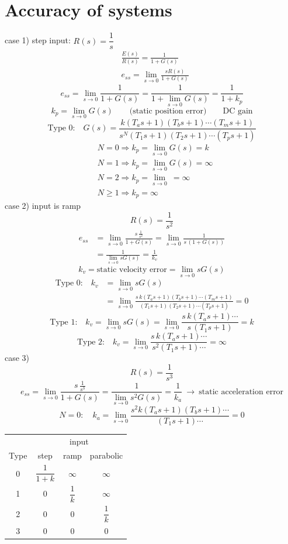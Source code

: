 \documentclass[11pt,a4paper]{article}
\begin{document}
\section{Accuracy of systems}
case 1) step input: $R(s)=\dfrac{1}{s}$
\begin{align*}
&\frac{E(s)}{R(s)}=\frac{1}{1+G(s)}\\
&e_{ss}=\lim_{s\to0}\frac{sR(s)}{1+G(s)}
\end{align*}
\[ e_{ss}=\lim_{s\to0}\frac{1}{1+G(s)}=\frac{1}{1+\lim\limits_{s\to0}G(s)}=\frac{1}{1+k_p} \]
\[ k_p=\lim_{s\to0}G(s)\qquad\text{(static position error)}\qquad\text{DC gain} \]
\[ \text{Type 0:}\quad G(s)=\frac{k(T_as+1)(T_bs+1)\cdots(T_ms+1)}{s^{N}(T_1s+1)(T_2s+1)\cdots(T_ps+1)} \]
\begin{align*}
&N=0\Rightarrow k_p=\lim_{s\to0}G(s)=k\\
&N=1\Rightarrow k_p=\lim_{s\to0}G(s)=\infty\\
&N=2\Rightarrow k_p=\lim_{s\to0}\ =\infty\\
&N\geq1\Rightarrow k_p=\infty
\end{align*}
case 2) input is ramp
\[ R(s)=\frac{1}{s^{2}} \]
\begin{align*}
e_{ss}&=\lim_{s\to0}\frac{s\,\frac{1}{s^{2}}}{1+G(s)}=\lim_{s\to0}\frac{1}{s\,(1+G(s))}\\
&=\frac{1}{\lim\limits_{s\to0}sG(s)}=\frac{1}{k_v}
\end{align*}
\[ k_v=\text{static velocity error}=\lim_{s\to0}sG(s) \]
\begin{align*}
\text{Type 0:}\quad k_v&=\lim_{s\to0}sG(s)\\
&=\lim_{s\to0}\frac{s\,k(T_as+1)(T_bs+1)\cdots(T_ms+1)}{(T_1s+1)(T_2s+1)\cdots(T_ps+1)}=0
\end{align*}
\[ \text{Type 1:}\quad k_v=\lim_{s\to0}sG(s)=\lim_{s\to0}\frac{s\,k(T_as+1)\cdots}{s\,(T_1s+1)}=k \]
\[ \text{Type 2:}\quad k_v=\lim_{s\to0}\frac{s\,k(T_as+1)\cdots}{s^{2}(T_1s+1)\cdots}=\infty \]
case 3)
\[ R(s)=\frac{1}{s^{3}} \]
\[ e_{ss}=\lim_{s\to0}\frac{s\,\frac{1}{s^{3}}}{1+G(s)}=\frac{1}{\lim\limits_{s\to0}s^{2}G(s)}=\frac{1}{k_a}\ \rightarrow\ \text{static acceleration error} \]
\[ N=0:\quad k_a=\lim_{s\to0}\frac{s^{2}k(T_as+1)(T_bs+1)\cdots}{(T_1s+1)\cdots}=0 \]

\begin{center}
\begin{tabular}{c|c|c|c}
 & \multicolumn{3}{c}{input}\\
Type & step & ramp & parabolic\\
\hline
0 & $\dfrac{1}{1+k}$ & $\infty$ & $\infty$\\
1 & $0$ & $\dfrac{1}{k}$ & $\infty$\\
2 & $0$ & $0$ & $\dfrac{1}{k}$\\
3 & $0$ & $0$ & $0$
\end{tabular}
\end{center}
\end{document}
